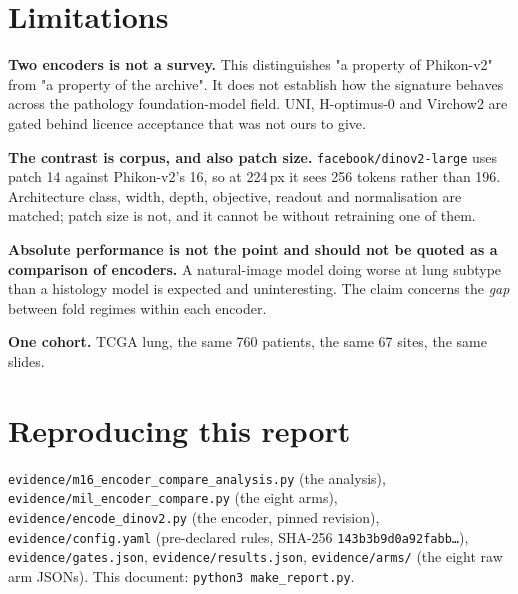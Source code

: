 \documentclass[11pt,a4paper]{article}
\begin{document}
\section{Limitations}

\textbf{Two encoders is not a survey.} This distinguishes "a property of Phikon-v2" from "a
property of the archive". It does not establish how the signature behaves across the pathology
foundation-model field. UNI, H-optimus-0 and Virchow2 are gated behind licence acceptance that was
not ours to give.

\textbf{The contrast is corpus, and also patch size.} \texttt{facebook/dinov2-large} uses patch 14 against
Phikon-v2's 16, so at 224\,px it sees 256 tokens rather than 196. Architecture class, width, depth,
objective, readout and normalisation are matched; patch size is not, and it cannot be without
retraining one of them.

\textbf{Absolute performance is not the point and should not be quoted as a comparison of
encoders.} A natural-image model doing worse at lung subtype than a histology model is expected
and uninteresting. The claim concerns the \emph{gap} between fold regimes within each encoder.

\textbf{One cohort.} TCGA lung, the same 760 patients, the same 67 sites, the same slides.

\section*{Reproducing this report}

\texttt{evidence/m16\_encoder\_compare\_analysis.py} (the analysis),
\texttt{evidence/mil\_encoder\_compare.py} (the eight arms),
\texttt{evidence/encode\_dinov2.py} (the encoder, pinned revision),
\texttt{evidence/config.yaml} (pre-declared rules, SHA-256
\texttt{143b3b9d0a92fabb\ldots}),
\texttt{evidence/gates.json}, \texttt{evidence/results.json},
\texttt{evidence/arms/} (the eight raw arm JSONs).
This document: \texttt{python3 make\_report.py}.
\end{document}
